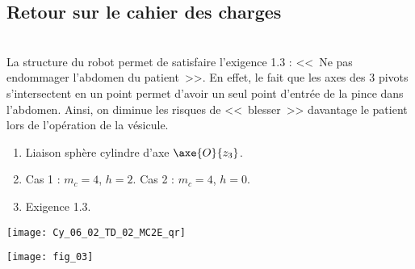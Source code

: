 \subsection*{Retour sur le cahier des charges}



\ifprof
\begin{corrige}~\\
La structure du robot permet de satisfaire l'exigence 1.3 : <<~Ne pas endommager l'abdomen du patient~>>. En effet, le fait que les axes des 3 pivots s'intersectent en un point permet d'avoir un seul point d'entrée de la pince dans l'abdomen. Ainsi, on diminue les risques de <<~blesser~>> davantage le patient lors de l'opération de la vésicule. 
\end{corrige}
\else
\fi


\ifprof
\else
\ifcolle
\else
\begin{marginfigure}[-4cm]
\begin{solution}
\begin{enumerate}
\item Liaison sphère cylindre d'axe $\axe{O}{z_3}$.
\item Cas 1 : $m_c=4$, $h=2$. Cas 2 : $m_c=4$, $h=0$.
\item Exigence 1.3.
\end{enumerate} 
\end{solution}
\end{marginfigure}
\fi
\fi
\normalsize


\ifprof
\else

\ifprof
\else
\begin{marginfigure}
\centering
\texttt{[image: Cy\_06\_02\_TD\_02\_MC2E\_qr]}
\end{marginfigure}
\fi


\begin{center}
\texttt{[image: fig\_03]}
\end{center}
\fi

